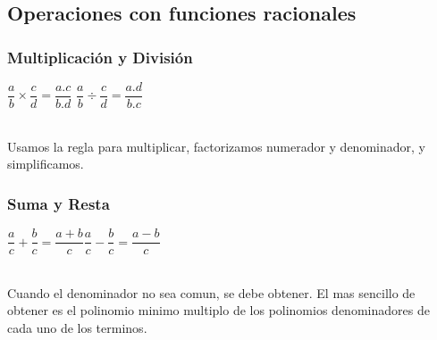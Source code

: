 \documentclass[10pt]{article}
\begin{document}
\subsection{Operaciones con funciones racionales}
\subsubsection{Multiplicación y División}
\begin{mdframed}[roundcorner=10pt]
\begin{center}
$\dfrac{a}{b} \times \dfrac{c}{d} = \dfrac{a.c}{b.d}$ \hspace{1cm} $\dfrac{a}{b} \div \dfrac{c}{d} = \dfrac{a.d}{b.c}$\\ \
\end{center}
Usamos la regla para multiplicar, factorizamos numerador y denominador, y simplificamos.
\end{mdframed}
\subsubsection{Suma y Resta}
\begin{mdframed}[roundcorner=10pt]
\begin{center}
$\dfrac{a}{c}+\dfrac{b}{c}=\dfrac{a+b}{c}$\hspace{1cm}$\dfrac{a}{c}-\dfrac{b}{c}=\dfrac{a-b}{c}$\\ \
\end{center}
Cuando el denominador no sea comun, se debe obtener. El mas sencillo de obtener es el polinomio minimo multiplo de los polinomios denominadores de cada uno de los terminos.
\end{mdframed}
\end{document}
